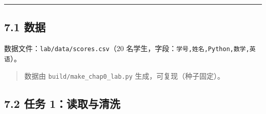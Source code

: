 \begin{center}\rule{0.5\linewidth}{0.5pt}\end{center}

\subsection{7.1 数据}\label{ux6570ux636e}

数据文件：\texttt{lab/data/scores.csv}（20
名学生，字段：\texttt{学号,姓名,Python,数学,英语}）。

\begin{Shaded}
\begin{Highlighting}[]
\end{Highlighting}
\end{Shaded}

\begin{quote}
数据由 \texttt{build/make\_chap0\_lab.py} 生成，可复现（种子固定）。
\end{quote}

\subsection{7.2 任务
1：读取与清洗}\label{ux4efbux52a1-1ux8bfbux53d6ux4e0eux6e05ux6d17}

\begin{Shaded}
\begin{Highlighting}[]

 \NormalTok{(}\OperatorTok{=}\NormalTok{) }
\OperatorTok{=} 

\NormalTok{(}\NormalTok{, }
\NormalTok{(rows[}\NormalTok{])}
\OperatorTok{=}\NormalTok{ [r } \NormalTok{ r[}\NormalTok{].strip() } \NormalTok{ r[}\NormalTok{].strip()]}
\NormalTok{(}
\end{Highlighting}
\end{Shaded}

